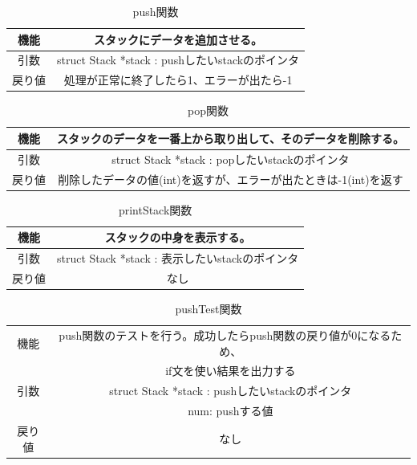 \documentclass[dvipdfmx]{jsarticle}
\begin{document}
\begin{table}[ht]
  \centering
  \begin{tabular}{|c|c|}
    \hline
    機能  & スタックにデータを追加させる。                         \\
    \hline
    引数  & struct Stack *stack : pushしたいstackのポインタ \\
    \hline
    戻り値 & 処理が正常に終了したら1、エラーが出たら-1                  \\
    \hline
  \end{tabular}
  \caption{push関数}
  \label{tab:push_func}
\end{table}
\begin{table}[ht]
  \centering
  \begin{tabular}{|c|c|}
    \hline
    機能  & スタックのデータを一番上から取り出して、そのデータを削除する。        \\
    \hline
    引数  & struct Stack *stack : popしたいstackのポインタ \\
    \hline
    戻り値 & 削除したデータの値(int)を返すが、エラーが出たときは-1(int)を返す \\
    \hline
  \end{tabular}
  \caption{pop関数}
  \label{tab:pop_func}
\end{table}
\begin{table}[ht]
  \centering
  \begin{tabular}{|c|c|}
    \hline
    機能  & スタックの中身を表示する。                         \\
    \hline
    引数  & struct Stack *stack : 表示したいstackのポインタ \\
    \hline
    戻り値 & なし                                    \\
    \hline
  \end{tabular}
  \caption{printStack関数}
  \label{tab:printstack_func}
\end{table}
\begin{table}[ht]
  \centering
  \begin{tabular}{|c|c|}
    \hline
    機能  & push関数のテストを行う。成功したらpush関数の戻り値が0になるため、   \\ &if文を使い結果を出力する           \\
    \hline
    引数  & struct Stack *stack : pushしたいstackのポインタ \\
        & num: pushする値                            \\
    \hline
    戻り値 & なし                                      \\
    \hline
  \end{tabular}
  \caption{pushTest関数}
  \label{tab:pushtest_func}
\end{table}
\end{document}
